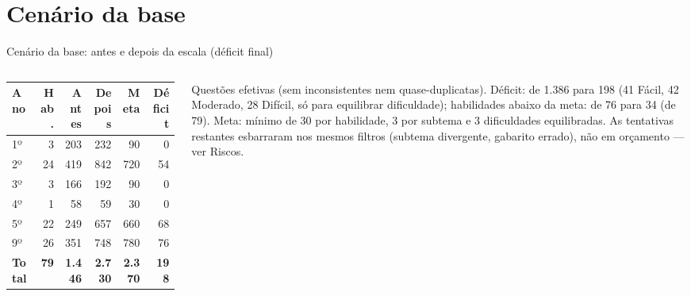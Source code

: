 \documentclass[aspectratio=169,11pt]{beamer}
\begin{document}
\section{Cenário da base}
\begin{frame}{Cenário da base: antes e depois da escala (déficit final)}
  \small
  \begin{columns}[T]
    \footnotesize
    \begin{tabularx}{\textwidth}{@{}l r r r r r@{}}
      \toprule
      \textbf{Ano} & \textbf{Hab.} & \textbf{Antes} & \textbf{Depois} & \textbf{Meta} & \textbf{Déficit} \\
      \midrule
      1º & 3  & 203 & 232 & 90  & 0 \\
      2º & 24 & 419 & 842 & 720 & 54 \\
      3º & 3  & 166 & 192 & 90  & 0 \\
      4º & 1  & 58  & 59  & 30  & 0 \\
      5º & 22 & 249 & 657 & 660 & 68 \\
      9º & 26 & 351 & 748 & 780 & 76 \\
      \midrule
      \textbf{Total} & \textbf{79} & \textbf{1.446} & \textbf{2.730} & \textbf{2.370} & \textbf{198} \\
      \bottomrule
    \end{tabularx}

    \vspace{5pt}
    \scriptsize Questões efetivas (sem inconsistentes nem quase-duplicatas). Déficit: de 1.386 para 198 (41 Fácil, 42 Moderado, 28 Difícil, só para equilibrar dificuldade); habilidades abaixo da meta: de 76 para 34 (de 79). Meta: mínimo de 30 por habilidade, 3 por subtema e 3 dificuldades equilibradas. As tentativas restantes esbarraram nos mesmos filtros (subtema divergente, gabarito errado), não em orçamento — ver Riscos.

  \end{columns}
\end{frame}
\end{document}
